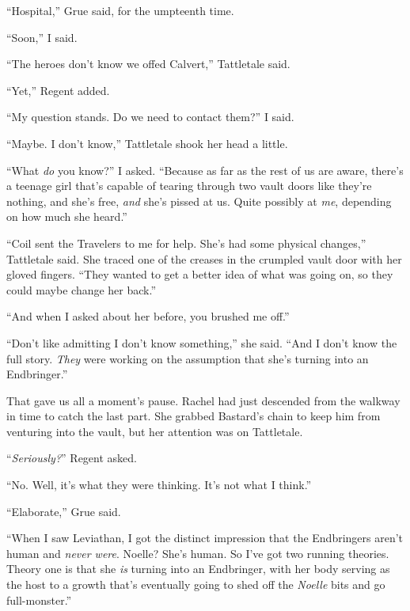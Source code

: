 ``Hospital,'' Grue said, for the umpteenth time.



``Soon,'' I said.



``The heroes don't know we offed Calvert,'' Tattletale said.



``Yet,'' Regent added.



``My question stands.  Do we need to contact them?'' I said.



``Maybe.  I don't know,'' Tattletale shook her head a little.



``What \emph{do} you know?'' I asked.  ``Because as far as the rest of us are aware, there's a teenage girl that's capable of tearing through two vault doors like they're nothing, and she's free, \emph{and} she's pissed at us.  Quite possibly at \emph{me}, depending on how much she heard.''



``Coil sent the Travelers to me for help.  She's had some physical changes,'' Tattletale said.  She traced one of the creases in the crumpled vault door with her gloved fingers.  ``They wanted to get a better idea of what was going on, so they could maybe change her back.''



``And when I asked about her before, you brushed me off.''



``Don't like admitting I don't know something,'' she said.  ``And I don't know the full story.  \emph{They} were working on the assumption that she's turning into an Endbringer.''



That gave us all a moment's pause.  Rachel had just descended from the walkway in time to catch the last part.  She grabbed Bastard's chain to keep him from venturing into the vault, but her attention was on Tattletale.



``\emph{Seriously?}'' Regent asked.



``No.  Well, it's what they were thinking.  It's not what I think.''



``Elaborate,'' Grue said.



``When I saw Leviathan, I got the distinct impression that the Endbringers aren't human and \emph{never were}.  Noelle?  She's human.  So I've got two running theories.  Theory one is that she \emph{is} turning into an Endbringer, with her body serving as the host to a growth that's eventually going to shed off the \emph{Noelle} bits and go full-monster.''



